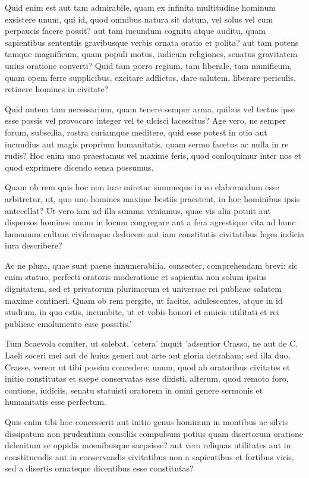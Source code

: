  Quid enim est aut tam admirabile, quam ex infinita multitudine hominum exsistere unum, qui id, quod omnibus natura sit datum, vel solus vel cum perpaucis facere possit? aut tam iucundum cognitu atque auditu, quam sapientibus sententiis gravibusque verbis ornata oratio et polita? aut tam potens tamque magnificum, quam populi motus, iudicum religiones, senatus gravitatem unius oratione converti? Quid tam porro regium, tam liberale, tam munificum, quam opem ferre supplicibus, excitare adflictos, dare salutem, liberare periculis, retinere homines in civitate?

 Quid autem tam necessarium, quam tenere semper arma, quibus vel tectus ipse esse possis vel provocare integer vel te ulcisci lacessitus? Age vero, ne semper forum, subsellia, rostra curiamque meditere, quid esse potest in otio aut iucundius aut magis proprium humanitatis, quam sermo facetus ac nulla in re rudis? Hoc enim uno praestamus vel maxime feris, quod conloquimur inter nos et quod exprimere dicendo sensa possumus.

 Quam ob rem quis hoc non iure miretur summeque in eo elaborandum esse arbitretur, ut, quo uno homines maxime bestiis praestent, in hoc hominibus ipsis antecellat? Ut vero iam ad illa summa veniamus, quae vis alia potuit aut dispersos homines unum in locum congregare aut a fera agrestique vita ad hunc humanum cultum civilemque deducere aut iam constitutis civitatibus leges iudicia iura describere?

 Ac ne plura, quae sunt paene innumerabilia, consecter, comprehendam brevi: sic enim statuo, perfecti oratoris moderatione et sapientia non solum ipsius dignitatem, sed et privatorum plurimorum et universae rei publicae salutem maxime contineri. Quam ob rem pergite, ut facitis, adulescentes, atque in id studium, in quo estis, incumbite, ut et vobis honori et amicis utilitati et rei publicae emolumento esse possitis.'

 Tum Scaevola comiter, ut solebat, 'cetera' inquit 'adsentior Crasso, ne aut de C. Laeli soceri mei aut de huius generi aut arte aut gloria detraham; sed illa duo, Crasse, vereor ut tibi possim concedere: unum, quod ab oratoribus civitates et initio constitutas et saepe conservatas esse dixisti, alterum, quod remoto foro, contione, iudiciis, senatu statuisti oratorem in omni genere sermonis et humanitatis esse perfectum.

 Quis enim tibi hoc concesserit aut initio genus hominum in montibus ac silvis dissipatum non prudentium consiliis compulsum potius quam disertorum oratione delenitum se oppidis moenibusque saepsisse? aut vero reliquas utilitates aut in constituendis aut in conservandis civitatibus non a sapientibus et fortibus viris, sed a disertis ornateque dicentibus esse constitutas?

